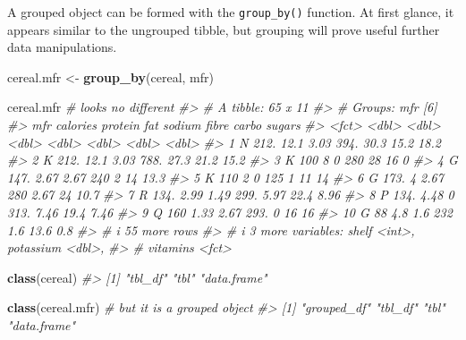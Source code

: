 \documentclass[
]{book}
\newenvironment{Shaded}{\begin{snugshade}}{\end{snugshade}}
\newcommand{\CommentTok}[1]{\textcolor[rgb]{0.56,0.35,0.01}{\textit{#1}}}
\newcommand{\FunctionTok}[1]{\textcolor[rgb]{0.13,0.29,0.53}{\textbf{#1}}}
\newcommand{\NormalTok}[1]{#1}
\newcommand{\OtherTok}[1]{\textcolor[rgb]{0.56,0.35,0.01}{#1}}
\begin{document}
A grouped object can be formed with the \texttt{group\_by()} function. At first glance, it appears similar to the ungrouped tibble, but grouping will prove useful further data manipulations.

\begin{Shaded}
\begin{Highlighting}[]
\NormalTok{cereal.mfr }\OtherTok{\textless{}{-}} \FunctionTok{group\_by}\NormalTok{(cereal, mfr)}

\NormalTok{cereal.mfr          }\CommentTok{\# looks no different}
\CommentTok{\#\textgreater{} \# A tibble: 65 x 11}
\CommentTok{\#\textgreater{} \# Groups:   mfr [6]}
\CommentTok{\#\textgreater{}    mfr   calories protein   fat sodium fibre carbo sugars}
\CommentTok{\#\textgreater{}    \textless{}fct\textgreater{}    \textless{}dbl\textgreater{}   \textless{}dbl\textgreater{} \textless{}dbl\textgreater{}  \textless{}dbl\textgreater{} \textless{}dbl\textgreater{} \textless{}dbl\textgreater{}  \textless{}dbl\textgreater{}}
\CommentTok{\#\textgreater{}  1 N         212.   12.1   3.03   394. 30.3   15.2  18.2 }
\CommentTok{\#\textgreater{}  2 K         212.   12.1   3.03   788. 27.3   21.2  15.2 }
\CommentTok{\#\textgreater{}  3 K         100     8     0      280  28     16     0   }
\CommentTok{\#\textgreater{}  4 G         147.    2.67  2.67   240   2     14    13.3 }
\CommentTok{\#\textgreater{}  5 K         110     2     0      125   1     11    14   }
\CommentTok{\#\textgreater{}  6 G         173.    4     2.67   280   2.67  24    10.7 }
\CommentTok{\#\textgreater{}  7 R         134.    2.99  1.49   299.  5.97  22.4   8.96}
\CommentTok{\#\textgreater{}  8 P         134.    4.48  0      313.  7.46  19.4   7.46}
\CommentTok{\#\textgreater{}  9 Q         160     1.33  2.67   293.  0     16    16   }
\CommentTok{\#\textgreater{} 10 G          88     4.8   1.6    232   1.6   13.6   0.8 }
\CommentTok{\#\textgreater{} \# i 55 more rows}
\CommentTok{\#\textgreater{} \# i 3 more variables: shelf \textless{}int\textgreater{}, potassium \textless{}dbl\textgreater{},}
\CommentTok{\#\textgreater{} \#   vitamins \textless{}fct\textgreater{}}

\FunctionTok{class}\NormalTok{(cereal)}
\CommentTok{\#\textgreater{} [1] "tbl\_df"     "tbl"        "data.frame"}

\FunctionTok{class}\NormalTok{(cereal.mfr)   }\CommentTok{\# but it is a grouped object}
\CommentTok{\#\textgreater{} [1] "grouped\_df" "tbl\_df"     "tbl"        "data.frame"}
\end{Highlighting}
\end{Shaded}
\end{document}
